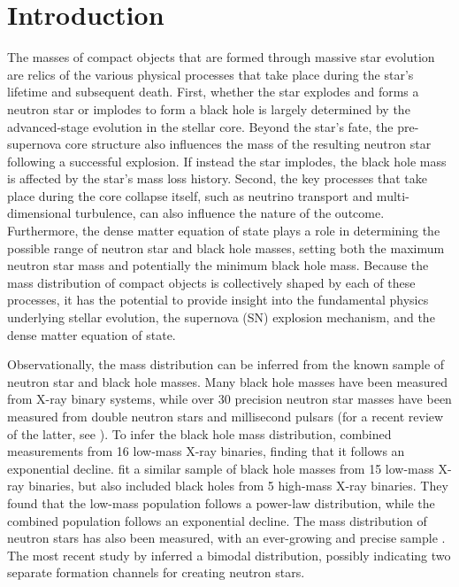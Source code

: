 \documentclass[]{emulateapj}
\begin{document}
\maketitle

\section{Introduction}

The masses of compact objects that are formed through massive star evolution are relics of the various physical processes that take place during the star's lifetime and subsequent death. First, whether the star explodes and forms a neutron star or implodes to form a black hole is largely determined by the advanced-stage evolution in the stellar core. Beyond the star's fate, the pre-supernova core structure also influences the mass of the resulting neutron star following a successful explosion. If instead the star implodes, the black hole mass is affected by the star's mass loss history. Second, the key processes that take place during the core collapse itself, such as neutrino transport and multi-dimensional turbulence, can also influence the nature of the outcome. Furthermore, the dense matter equation of state plays a role in determining the possible range of neutron star and black hole masses, setting both the maximum neutron star mass and potentially the minimum black hole mass. Because the mass distribution of compact objects is collectively shaped by each of these processes, it has the potential to provide insight into the fundamental physics underlying stellar evolution, the supernova (SN) explosion mechanism, and the dense matter equation of state.


Observationally, the mass distribution can be inferred from the known sample of neutron star and black hole masses. Many black hole masses have been measured from X-ray binary systems, while over 30 precision neutron star masses have been measured from double neutron stars and millisecond pulsars (for a recent review of the latter, see \citealt{Ozel2016}).  To infer the black hole mass distribution, \citet{Ozel2010b} combined measurements from 16 low-mass X-ray binaries, finding that it follows an exponential decline. \citet{Farr2011} fit a similar sample of black hole masses from 15 low-mass X-ray binaries, but also included black holes from 5 high-mass X-ray binaries. They found that the low-mass population follows a power-law distribution, while the combined population follows an exponential decline. The mass distribution of neutron stars has also been measured, with an ever-growing and precise sample \citep{Thorsett1999, Ozel2012, Kiziltan2013, Antoniadis2016}. The most recent study by \citet{Antoniadis2016} inferred a bimodal distribution, possibly indicating two separate formation channels for creating neutron stars.
\end{document}

